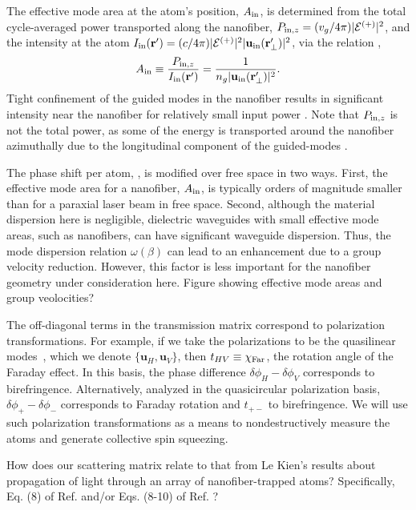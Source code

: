 \documentclass[preprint,aps,pra,onecolumn]{revtex4-1} %
\newcommand{\change}[1]{{\color{RoyalBlue} #1}}
\newcommand{\comment}[1]{{\color{Maroon} #1}}
\begin{document}
The effective mode area at the atom's position, $A_{\rm in}$, is determined from the total cycle-averaged power transported along the nanofiber, $P_{{\rm in},z} = (v_g/4\pi) |\mathcal{E}^{(+)}|^2$, and the intensity at the atom $I_{\rm in}(\mathbf{r}') = (c/4\pi)|\mathcal{E}^{(+)}|^2|\mathbf{u}_{\rm in}(\mathbf{r}_\perp')|^2$, via the relation \cite{domokos_quantum_2002},
 	\begin{align} \label{Eq::AreaIn}
 		A_{\rm in} \equiv \frac{P_{{\rm in},z}}{I_{\rm in}(\mathbf{r}')} = \frac{1}{n_g |\mathbf{u}_{\rm in}(\mathbf{r}'_\perp)|^{2}}.
	\end{align}
Tight confinement of the guided modes in the nanofiber results in significant intensity near the nanofiber for relatively small input power \cite{bures_power_1999}.  Note that $P_{{\rm in},z}$ is not the total power, as some of the energy is transported around the nanofiber azimuthally due to the longitudinal component of the guided-modes \cite{le_kien_scattering_2006}.

The phase shift per atom, , is modified over free space in two ways.  First, the effective mode area for a nanofiber, $A_{\rm in}$, is typically orders of magnitude smaller than for a paraxial laser beam in free space.  \change{Second, although the material dispersion here is negligible, dielectric waveguides with small effective mode areas, such as nanofibers, can have significant waveguide dispersion. Thus, the mode dispersion relation $\omega(\beta)$ can lead to an enhancement due to a group velocity reduction. However, this factor is less important for the nanofiber geometry under consideration here.} \comment{Figure showing effective mode areas and group veolocities?}
 
 The off-diagonal terms in the transmission matrix correspond to polarization transformations.  For  example, if we take the polarizations to be the quasilinear modes~\cite{kien_field_2004}, which we denote $\{ \mathbf{u}_{H}, \mathbf{u}_{V}\}$, then $t_{HV} \equiv \chi_{\rm Far}$,  the rotation angle of the Faraday effect.  In this basis, the phase difference $\delta  \phi_H - \delta \phi_V$ corresponds to birefringence.  Alternatively, analyzed in the quasicircular polarization basis, $\delta \phi_+ -\delta  \phi_-$ corresponds to Faraday rotation and $t_{+-}$ to birefringence.  We will use such polarization transformations as a means to nondestructively measure the atoms and generate collective spin squeezing.

{\color{blue} How does our scattering matrix relate to that from Le Kien's results about propagation of light through an array of nanofiber-trapped atoms?  Specifically, Eq. (8) of Ref. \cite{le_kien_correlations_2008} and/or Eqs. (8-10) of Ref. \cite{le_kien_propagation_2014}?  
}
\end{document}
